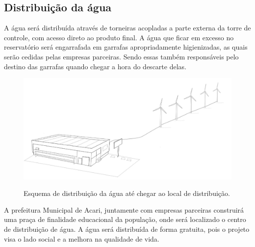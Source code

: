 \subsection{Distribuição da água}
  A água será distribuída através de torneiras acopladas a parte externa da torre de controle, com acesso direto ao produto final. A água que ficar em excesso no reservatório será engarrafada em garrafas apropriadamente higienizadas, as quais serão cedidas pelas empresas parceiras. Sendo essas também responsáveis pelo destino das garrafas quando chegar a hora do descarte delas.
  
  \FloatBarrier
  \begin{figure}[!h]
      \centering
      \includegraphics[scale = 0.4]{editaveis/figuras/distribuicao_agua}
      \label{distribuicao_agua}
      \caption[Distribuição água]{Esquema de distribuição da água até chegar ao local de distribuição.}
  \end{figure}
  \FloatBarrier
  
  A prefeitura Municipal de Acari, juntamente com empresas parceiras construirá uma praça de finalidade educacional da população, onde será localizado o centro de distribuição de água. A água será distribuída de forma gratuita, pois o projeto visa o lado social e a melhora na qualidade de vida.

